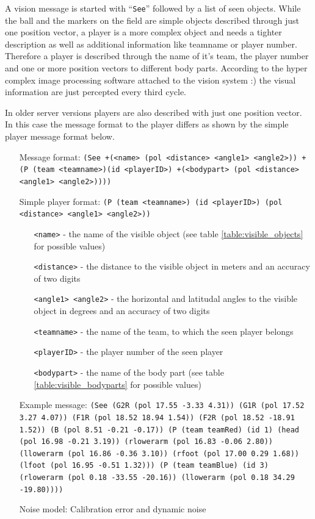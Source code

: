 A vision message is started with ``\texttt{See}'' followed by a list of seen
objects. While the ball and the markers on the field are simple objects described
through just one position vector, a player is a more complex object and needs a
tighter description as well as additional information like teamname or
player number. Therefore a player is described through the name of it's team,
the player number and one or more position vectors to different body parts.
According to the hyper complex image processing software attached to the vision
system :) the visual information are just percepted every third cycle.

In older server versions players are also described with just one position
vector. In this case the message format to the player differs as shown by the
simple player message format below.
\begin{itemize}
	\item[Message format:] \texttt{(See +(<name> (pol <distance> <angle1>
	<angle2>)) +(P (team <teamname>)\newline (id <playerID>) +(<bodypart>
	(pol <distance> <angle1> <angle2>))))}
	\item[Simple player format:] \texttt{(P (team <teamname>) (id <playerID>)
	(pol <distance> <angle1> <angle2>))}
		\begin{itemize}
		  \item[\texttt{<name>} -] the name of the visible object (see table
		  \ref{table:visible_objects} for possible values)
		  \item[\texttt{<distance>} -] the distance to the visible object in meters
		  and an accuracy of two digits
		  \item[\texttt{<angle1> <angle2>} -] the horizontal and latitudal angles to
		  the visible object in degrees and an accuracy of two digits
		  \item[\texttt{<teamname>} -] the name of the team, to which the seen player
		  belongs
		  \item[\texttt{<playerID>} -] the player number of the seen player
		  \item[\texttt{<bodypart>} -] the name of the body part (see table
		  \ref{table:visible_bodyparts} for possible values)
		\end{itemize}
	\item[Example message:] \texttt{(See 
    (G2R (pol 17.55 -3.33 4.31)) 
    (G1R (pol 17.52 3.27 4.07)) 
    (F1R (pol 18.52 18.94 1.54)) 
    (F2R (pol 18.52 -18.91 1.52)) 
    (B (pol 8.51 -0.21 -0.17)) 
    (P (team teamRed) (id 1) 
        (head (pol 16.98 -0.21 3.19)) 
        (rlowerarm (pol 16.83 -0.06 2.80)) 
        (llowerarm (pol 16.86 -0.36 3.10)) 
        (rfoot (pol 17.00 0.29 1.68)) 
        (lfoot (pol 16.95 -0.51 1.32))) 
    (P (team teamBlue) (id 3) 
        (rlowerarm (pol 0.18 -33.55 -20.16)) 
        (llowerarm (pol 0.18 34.29 -19.80))))}
	\item[Noise model:] Calibration error and dynamic noise
\end{itemize}



